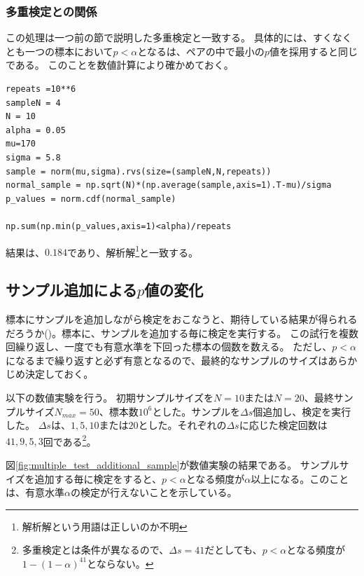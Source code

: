 \subsubsection{多重検定との関係}
この処理は一つ前の節で説明した多重検定と一致する。
具体的には、すくなくとも一つの標本において$p<\alpha$となるは、ペアの中で最小の$p$値を採用すると同じである。
このことを数値計算により確かめておく。
\begin{lstlisting}
repeats =10**6
sampleN = 4
N = 10
alpha = 0.05
mu=170
sigma = 5.8
sample = norm(mu,sigma).rvs(size=(sampleN,N,repeats))
normal_sample = np.sqrt(N)*(np.average(sample,axis=1).T-mu)/sigma
p_values = norm.cdf(normal_sample)

np.sum(np.min(p_values,axis=1)<alpha)/repeats
\end{lstlisting}
結果は、$0.184$であり、解析解\footnote{解析解という用語は正しいのか不明}と一致する。



\subsection{サンプル追加による$p$値の変化}
標本にサンプルを追加しながら検定をおこなうと、期待している結果が得られるだろうか(\cite{simmons2016false})。標本に、サンプルを追加する毎に検定を実行する。
この試行を複数回繰り返し、一度でも有意水準を下回った標本の個数を数える。
ただし、$p<\alpha$になるまで繰り返すと必ず有意となるので、最終的なサンプルのサイズはあらかじめ決定しておく。

以下の数値実験を行う。
初期サンプルサイズを$N=10$または$N=20$、最終サンプルサイズ$N_{max}=50$、標本数$10^6$とした。サンプルを$\Delta s$個追加し、検定を実行した。
$\Delta s$は、$1,5,10$または$20$とした。それぞれの$\Delta s$に応じた検定回数は$41,9,5,3$回である\footnote{多重検定とは条件が異なるので、$\Delta s=41$だとしても、$p<\alpha$となる頻度が$1-(1-\alpha)^{41}$とならない。}。


図\ref{fig:multiple_test_additional_sample}が数値実験の結果である。
サンプルサイズを追加する毎に検定をすると、$p<\alpha$となる頻度が$\alpha$以上になる。このことは、有意水準$\alpha$の検定が行えないことを示している。

